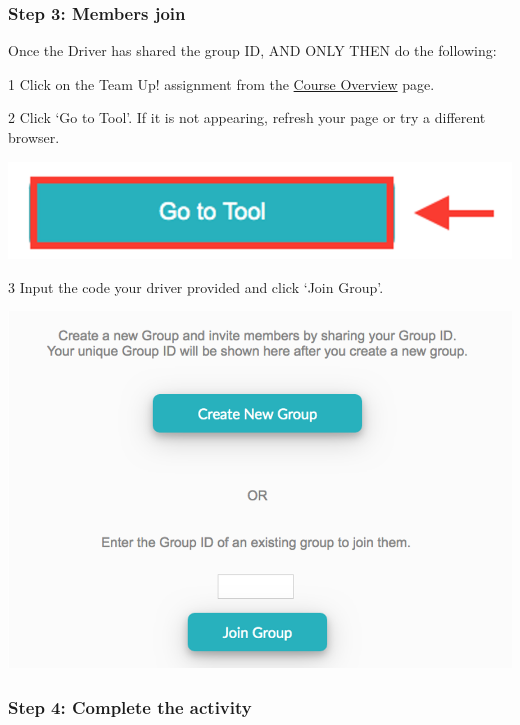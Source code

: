 \documentclass[
  openany]{book}
\begin{document}
\hypertarget{step-3-members-join}{%
\subsubsection{Step 3: Members join}\label{step-3-members-join}}

Once the Driver has shared the group ID, AND ONLY THEN do the following:

1 Click on the Team Up! assignment from the \href{https://q.utoronto.ca/courses/253305/pages/course-overview}{Course Overview} page.

2 Click `Go to Tool'. If it is not appearing, refresh your page or try a different browser.

\begin{center}\includegraphics[width=0.5\linewidth]{images/course-tools/gototool} \end{center}

3 Input the code your driver provided and click `Join Group'.

\begin{center}\includegraphics[width=0.45\linewidth]{images/course-tools/choose create} \end{center}

\hypertarget{step-4-complete-the-activity}{%
\subsubsection{Step 4: Complete the activity}\label{step-4-complete-the-activity}}
\end{document}
